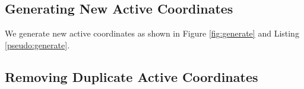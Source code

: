 \documentclass[annualconference]{acmsiggraph}  %
\begin{document}
\subsection{Generating New Active Coordinates}
\label{subsec:generatingNewActiveCoordinates}

We generate new active coordinates as shown in Figure \ref{fig:generate} and Listing \ref{pseudo:generate}.

\subsection{Removing Duplicate Active Coordinates}
\label{subsec:removingDuplicateActiveCoordinates}
\end{document}
